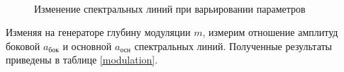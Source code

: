 \documentclass[a4paper, 12pt]{article}
\begin{document}
    \begin{figure}[H]
        \centering
        \\
        \caption{Изменение спектральных линий при варьировании параметров}
        \label{spectrum_C}
    \end{figure}

    Изменяя на генераторе глубину модуляции $m$, измерим отношение амплитуд боковой $a_\text{бок}$ и основной $a_\text{осн}$ спектральных линий. Полученные результаты приведены в таблице \ref{modulation}.
\end{document}
